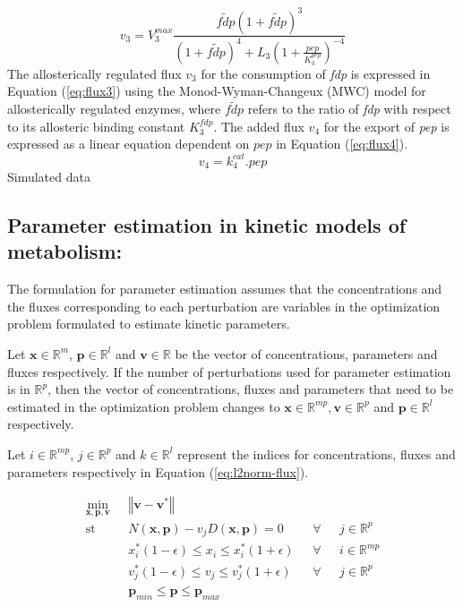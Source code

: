 \documentclass[10pt]{report}
\begin{document}
	\begin{equation}\label{eq:flux3}
	v_3 = V_{3}^{max}\frac{\tilde{fdp}\left(1+\tilde{fdp}\right)^3}{\left(1+\tilde{fdp}\right)^4+L_3\left(1+\frac{pep}{K_{3}^{pep}}\right)^{-4}}
	\end{equation}
	The allosterically regulated flux $v_3$ for the consumption of \textit{fdp} is expressed in Equation (\ref{eq:flux3}) using the Monod-Wyman-Changeux (MWC) model for allosterically regulated enzymes, where $\tilde{fdp}$ refers to the ratio of \textit{fdp} with respect to its allosteric binding constant $K_{3}^{fdp}$. The added flux $v_4$ for the export of \textit{pep} is expressed as a linear equation dependent on $pep$ in Equation (\ref{eq:flux4}).
	\begin{equation}\label{eq:flux4}
	v_4 = k_{4}^{cat}.pep
	\end{equation}
	Simulated data 
	
	\subsection{Parameter estimation in kinetic models of metabolism:}
	The formulation for parameter estimation assumes that the concentrations and the fluxes corresponding to each perturbation are variables in the optimization problem formulated to estimate kinetic parameters.
	
	Let $\mathbf{x}\in\mathbb{R}^m$, $\mathbf{p}\in\mathbb{R}^l$ and $\mathbf{v}\in\mathbb{R}$ be the vector of concentrations, parameters and fluxes respectively. If the number of perturbations used for parameter estimation is in $\mathbb{R}^p$, then the vector of concentrations, fluxes and parameters that need to be estimated in the optimization problem changes to $\mathbf{x}\in\mathbb{R}^{mp}, \mathbf{v}\in\mathbb{R}^{p}$ and $\mathbf{p}\in\mathbb{R}^{l}$ respectively. 
	
	Let $i\in\mathbb{R}^{mp}$, $j\in\mathbb{R}^{p}$ and $k\in\mathbb{R}^{l}$ represent the indices for concentrations, fluxes and parameters respectively in Equation (\ref{eq:l2norm-flux}).
	
	\begin{center}
		\begin{subequations}\label{eq:l2norm-flux}
			\begin{align}
			\underset{\mathbf{x},\mathbf{p},\mathbf{v}}{\mathrm{min}} & \text{      }\left\Vert \mathbf{v}-\mathbf{v}^*\right\Vert\\
			\mathrm{st}& \text{      }N(\mathbf{x},\mathbf{p}) - v_jD(\mathbf{x},\mathbf{p}) = 0 & \text{  }\forall & \text{ }j\in\mathbb{R}^p\\
			& \text{      }x^*_i(1-\epsilon)\le x_i \le x^*_i(1+\epsilon) & \text{  }\forall & \text{ }i\in\mathbb{R}^{mp}\\	
			& \text{      }v^*_j(1-\epsilon)\le v_j \le v^*_j(1+\epsilon) & \text{  }\forall & \text{ }j\in\mathbb{R}^{p}\\		
			& \text{      }\mathbf{p}_{min} \le \mathbf{p} \le \mathbf{p}_{max}
			\end{align}
		\end{subequations}
	\end{center}
\end{document}
